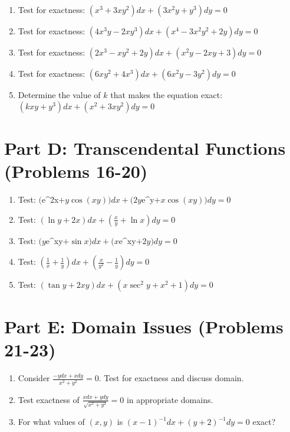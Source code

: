 \documentclass[12pt]{article}
\begin{document}
\begin{enumerate}[start=11]
\item Test for exactness: $(x^3 + 3xy^2)dx + (3x^2y + y^3)dy = 0$

\item Test for exactness: $(4x^3y - 2xy^3)dx + (x^4 - 3x^2y^2 + 2y)dy = 0$

\item Test for exactness: $(2x^3 - xy^2 + 2y)dx + (x^2y - 2xy + 3)dy = 0$

\item Test for exactness: $(6xy^2 + 4x^3)dx + (6x^2y - 3y^2)dy = 0$

\item Determine the value of $k$ that makes the equation exact:
$(kxy + y^3)dx + (x^2 + 3xy^2)dy = 0$
\end{enumerate}

\section*{Part D: Transcendental Functions (Problems 16-20)}

\begin{enumerate}[start=16]
\item Test: $($e^{2x}$ + y\cos(xy))dx + (2y$e^y$ + x\cos(xy))dy = 0$

\item Test: $(\ln y + 2x)dx + \left(\frac{x}{y} + \ln x\right)dy = 0$

\item Test: $(y$e^{xy}$ + \sin x)dx + (x$e^{xy}$ + 2y)dy = 0$

\item Test: $\left(\frac{1}{x} + \frac{1}{y}\right)dx + \left(\frac{x}{y^2} - \frac{1}{y}\right)dy = 0$

\item Test: $(\tan y + 2xy)dx + (x\sec^2 y + x^2 + 1)dy = 0$
\end{enumerate}

\section*{Part E: Domain Issues (Problems 21-23)}

\begin{enumerate}[start=21]
\item Consider $\frac{-y dx + x dy}{x^2 + y^2} = 0$. Test for exactness and discuss domain.

\item Test exactness of $\frac{x dx + y dy}{\sqrt{x^2 + y^2}} = 0$ in appropriate domains.

\item For what values of $(x,y)$ is $(x-1)^{-1}dx + (y+2)^{-1}dy = 0$ exact?
\end{enumerate}
\end{document}
